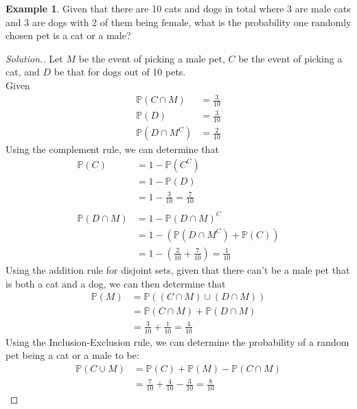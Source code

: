 \documentclass[12pt]{article}
\newcommand{\bbP}{\mathbb{P}}
\renewcommand{\_}[1]{\underline{ #1 }}
\theoremstyle{definition}
\newtheorem{example}[theorem]{Example}
\numberwithin{equation}{subsection}
\begin{document}
\begin{example}
Given that there are 10 cats and dogs in total where 3 are male cats and 3 are dogs with 2 of them being female, what is the probability one randomly chosen pet is a cat or a male?
\begin{proof}[Solution.]
	Let $M$ be the event of picking a male pet, $C$ be the event of picking a cat, and $D$ be that for dogs out of 10 pets. \\
	Given
	\begin{align*}		
		\bbP(C\cap M)&=\frac{3}{10} \\
		\bbP(D)&=\frac{3}{10} \\
		\bbP(D\cap M^C)&=\frac{2}{10}
	\end{align*}
	Using the complement rule, we can determine that 
	\begin{align*}
		\bbP(C)&=1-\bbP(C^C) \\
			&=1-\bbP(D) \\
			&=1-\frac{3}{10}=\frac{7}{10} \\ \\
		\bbP(D \cap M)&=1-\bbP(D \cap M)^C \\
			&=1-(\bbP(D\cap M^C)+\bbP(C)) \\
			&=1-
				\left(
					\frac{2}{10}+\frac{7}{10} 
				\right)
			=\frac{1}{10}
	\end{align*}
	Using the addition rule for disjoint sets, given that there can't be a male pet that is both a cat and a dog, we can then determine that
	\begin{align*}
		\bbP(M)&=\bbP((C\cap M)\cup (D\cap M)) \\
			&=\bbP(C\cap M)+\bbP(D\cap M) \\
			&=\frac{3}{10}+\frac{1}{10}=\frac{4}{10}
	\end{align*}
	Using the Inclusion-Exclusion rule, we can determine the probability of a random pet being a cat or a male to be: 
	\begin{align*}
		\bbP(C\cup M)&=\bbP(C)+\bbP(M)-\bbP(C\cap M) \\
			&=\frac{7}{10}+\frac{4}{10}-\frac{3}{10}=\frac{8}{10}
	\end{align*}
\end{proof}
\end{example}
\end{document}
